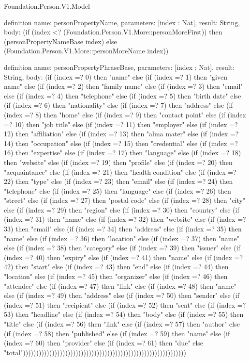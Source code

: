 \begin{lexlean}{Foundation.Person.V1.Model}
\begin{semanticmodule}
definition{
  name: personPropertyName,
  parameters: [index : Nat],
  result: String,
  body: (if (index <? (Foundation.Person.V1.More::personMoreFirst)) then (personPropertyNameBase index) else (Foundation.Person.V1.More::personMoreName index))
}

definition{
  name: personPropertyPhraseBase,
  parameters: [index : Nat],
  result: String,
  body: (if (index =? 0) then "name" else (if (index =? 1) then "given name" else (if (index =? 2) then "family name" else (if (index =? 3) then "email" else (if (index =? 4) then "telephone" else (if (index =? 5) then "birth date" else (if (index =? 6) then "nationality" else (if (index =? 7) then "address" else (if (index =? 8) then "home" else (if (index =? 9) then "contact point" else (if (index =? 10) then "job title" else (if (index =? 11) then "employer" else (if (index =? 12) then "affiliation" else (if (index =? 13) then "alma mater" else (if (index =? 14) then "occupation" else (if (index =? 15) then "credential" else (if (index =? 16) then "expertise" else (if (index =? 17) then "language" else (if (index =? 18) then "website" else (if (index =? 19) then "profile" else (if (index =? 20) then "acquaintance" else (if (index =? 21) then "health condition" else (if (index =? 22) then "type" else (if (index =? 23) then "email" else (if (index =? 24) then "telephone" else (if (index =? 25) then "language" else (if (index =? 26) then "street" else (if (index =? 27) then "postal code" else (if (index =? 28) then "city" else (if (index =? 29) then "region" else (if (index =? 30) then "country" else (if (index =? 31) then "name" else (if (index =? 32) then "website" else (if (index =? 33) then "email" else (if (index =? 34) then "address" else (if (index =? 35) then "name" else (if (index =? 36) then "location" else (if (index =? 37) then "name" else (if (index =? 38) then "category" else (if (index =? 39) then "issuer" else (if (index =? 40) then "expiry" else (if (index =? 41) then "name" else (if (index =? 42) then "start" else (if (index =? 43) then "end" else (if (index =? 44) then "location" else (if (index =? 45) then "organizer" else (if (index =? 46) then "attendee" else (if (index =? 47) then "link" else (if (index =? 48) then "name" else (if (index =? 49) then "address" else (if (index =? 50) then "sender" else (if (index =? 51) then "recipient" else (if (index =? 52) then "sent" else (if (index =? 53) then "headline" else (if (index =? 54) then "body" else (if (index =? 55) then "title" else (if (index =? 56) then "link" else (if (index =? 57) then "author" else (if (index =? 58) then "published" else (if (index =? 59) then "name" else (if (index =? 60) then "provider" else (if (index =? 61) then "due" else "total"))))))))))))))))))))))))))))))))))))))))))))))))))))))))))))))
}


\end{semanticmodule}
\end{lexlean}
